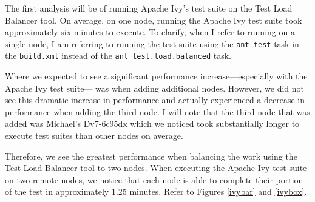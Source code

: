 \documentclass{article}
\begin{document}
{The first analysis will be of running Apache Ivy's test suite on the Test Load Balancer tool.
On average, on one node, running the Apache Ivy test suite took approximately six minutes to
execute. To clarify, when I refer to running on a single node, I am referring to running the
test suite using the \texttt{ant test} task in the \texttt{build.xml} instead of the \texttt{ant test.load.balanced}
task.

Where we expected to see a significant performance increase---especially with the Apache Ivy test suite---
was when adding additional nodes. However, we did not see this dramatic increase in performance
and actually experienced a decrease in performance when adding the third node. I will note
that the third node that was added was Michael's Dv7-6c95dx which we noticed took substantially
longer to execute test suites than other nodes on average.

Therefore, we see the greatest performance when balancing the work using the Test Load Balancer tool
to two nodes. When executing the Apache Ivy test suite on two remote nodes, we notice that each
node is able to complete their portion of the test in approximately 1.25 minutes. Refer to Figures
\ref{ivybar} and \ref{ivybox}.


}
\end{document}
